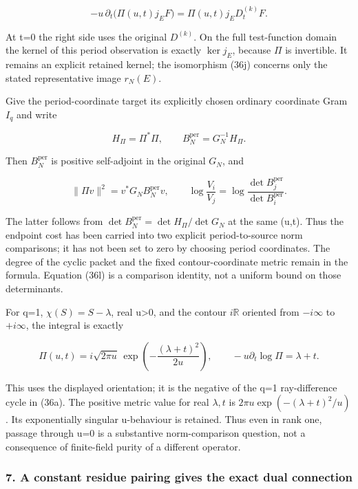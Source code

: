 \[
\boxed{-u\,\partial_t\bigl(\Pi(u,t)j_EF\bigr)
=\Pi(u,t)j_ED_t^{(k)}F.}
\tag{36j.1}
\]

At t=0 the right side uses the original \(D^{(k)}\). On the full test-function domain the kernel of this period observation is exactly \(\ker j_E\), because \(\Pi\) is invertible. It remains an explicit retained kernel; the isomorphism (36j) concerns only the stated representative image \(r_N(E)\).

Give the period-coordinate target its explicitly chosen ordinary coordinate Gram \(I_q\) and write

\[
H_\Pi=\Pi^*\Pi,\qquad
B_N^{\mathrm{per}}=G_N^{-1}H_\Pi.
\tag{36k}
\]

Then \(B_N^{\mathrm{per}}\) is positive self-adjoint in the original \(G_N\), and

\[
\|\Pi v\|^2=v^*G_NB_N^{\mathrm{per}}v,
\qquad
\boxed{\log\frac{V_i}{V_j}
=\log\frac{\det B_j^{\mathrm{per}}}{\det B_i^{\mathrm{per}}}.}
\tag{36l}
\]

The latter follows from \(\det B_N^{\mathrm{per}}=\det H_\Pi/\det G_N\) at the same (u,t). Thus the endpoint cost has been carried into two explicit period-to-source norm comparisons; it has not been set to zero by choosing period coordinates. The degree of the cyclic packet and the fixed contour-coordinate metric remain in the formula. Equation (36l) is a comparison identity, not a uniform bound on those determinants.

For q=1, \(\chi(S)=S-\lambda\), real u\textgreater0, and the contour \(i\mathbb R\) oriented from \(-i\infty\) to \(+i\infty\), the integral is exactly

\[
\boxed{\Pi(u,t)=i\sqrt{2\pi u}\,
\exp\!\left(-\frac{(\lambda+t)^2}{2u}\right),
\qquad -u\partial_t\log\Pi=\lambda+t.}
\tag{36m}
\]

This uses the displayed orientation; it is the negative of the q=1 ray-difference cycle in (36a). The positive metric value for real \(\lambda,t\) is \(2\pi u\exp(- (\lambda+t)^2/u)\). Its exponentially singular u-behaviour is retained. Thus even in rank one, passage through u=0 is a substantive norm-comparison question, not a consequence of finite-field purity of a different operator.

\subsubsection{7. A constant residue pairing gives the exact dual connection}\label{endpoint-exponential_original--a-constant-residue-pairing-gives-the-exact-dual-connection}

